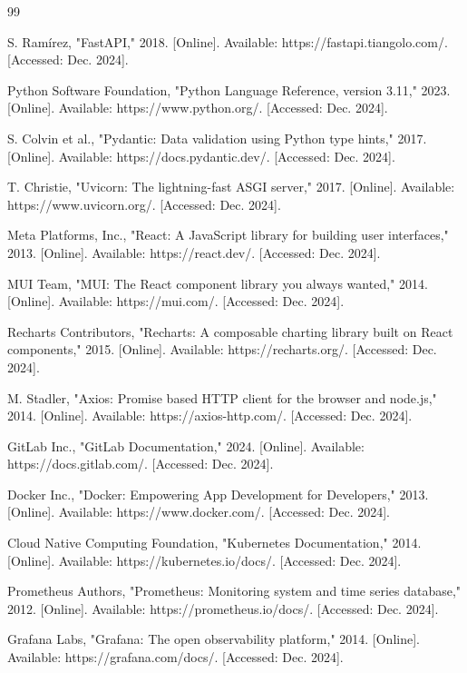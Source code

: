 \begin{thebibliography}{99}

S. Ramírez, "FastAPI," 2018. [Online]. Available: https://fastapi.tiangolo.com/. [Accessed: Dec. 2024].

Python Software Foundation, "Python Language Reference, version 3.11," 2023. [Online]. Available: https://www.python.org/. [Accessed: Dec. 2024].

S. Colvin et al., "Pydantic: Data validation using Python type hints," 2017. [Online]. Available: https://docs.pydantic.dev/. [Accessed: Dec. 2024].

T. Christie, "Uvicorn: The lightning-fast ASGI server," 2017. [Online]. Available: https://www.uvicorn.org/. [Accessed: Dec. 2024].

Meta Platforms, Inc., "React: A JavaScript library for building user interfaces," 2013. [Online]. Available: https://react.dev/. [Accessed: Dec. 2024].

MUI Team, "MUI: The React component library you always wanted," 2014. [Online]. Available: https://mui.com/. [Accessed: Dec. 2024].

Recharts Contributors, "Recharts: A composable charting library built on React components," 2015. [Online]. Available: https://recharts.org/. [Accessed: Dec. 2024].

M. Stadler, "Axios: Promise based HTTP client for the browser and node.js," 2014. [Online]. Available: https://axios-http.com/. [Accessed: Dec. 2024].

GitLab Inc., "GitLab Documentation," 2024. [Online]. Available: https://docs.gitlab.com/. [Accessed: Dec. 2024].

Docker Inc., "Docker: Empowering App Development for Developers," 2013. [Online]. Available: https://www.docker.com/. [Accessed: Dec. 2024].

Cloud Native Computing Foundation, "Kubernetes Documentation," 2014. [Online]. Available: https://kubernetes.io/docs/. [Accessed: Dec. 2024].

Prometheus Authors, "Prometheus: Monitoring system and time series database," 2012. [Online]. Available: https://prometheus.io/docs/. [Accessed: Dec. 2024].

Grafana Labs, "Grafana: The open observability platform," 2014. [Online]. Available: https://grafana.com/docs/. [Accessed: Dec. 2024].


\end{thebibliography}
